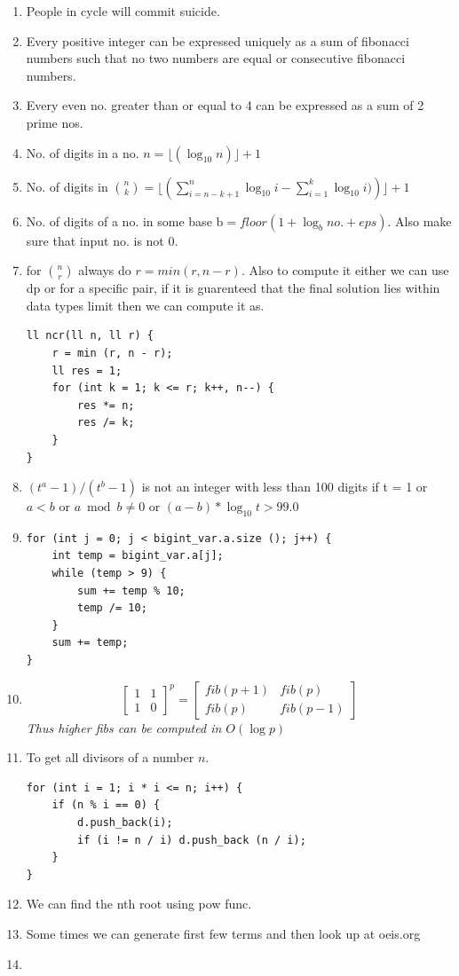 \documentclass[8pt, a4paper, oneside, twocolumn]{extarticle}
\begin{document}
\begin{enumerate}
    \item People in cycle will commit suicide.
    \item Every positive integer can be expressed uniquely as a sum of fibonacci numbers such that no two numbers are equal or consecutive fibonacci numbers.
    \item Every even no. greater than or equal to 4 can be expressed as a sum of 2 prime nos.
    \item No. of digits in a no. $n = \lfloor(\log_{10}{n})\rfloor + 1$
    \item No. of digits in $\binom{n}{k} = \lfloor(\sum_{i = n - k + 1}^{n}\log_{10}{i} - \sum_{i = 1}^{k}\log_{10}{i)})\rfloor + 1$
    \item No. of digits of a no. in some base b$ = floor(1 + \log_b{no.} + eps)$. Also make sure that input no. is not 0.
    \item for $\binom{n}{r}$ always do $r = min (r, n - r)$. Also to compute it either we can use dp or for a specific pair, if it is guarenteed that the final solution lies within data types limit then we can compute it as. \begin{verbatim}
ll ncr(ll n, ll r) {
    r = min (r, n - r);
    ll res = 1;
    for (int k = 1; k <= r; k++, n--) {
        res *= n;
        res /= k;
    }
}
    \end{verbatim}
    \item $(t^a - 1) / (t^b - 1)$ is not an integer with less than 100 digits if t = 1 or $a < b$ or $a \bmod b \neq 0$ or $(a - b) * \log_{10}{t} > 99.0$
    \item \begin{verbatim}
for (int j = 0; j < bigint_var.a.size (); j++) {
    int temp = bigint_var.a[j];
    while (temp > 9) {
        sum += temp % 10;
        temp /= 10;
    }
    sum += temp;
}
    \end{verbatim}
    \item \[\begin{bmatrix}
    1 & 1\\
    1 & 0
    \end{bmatrix}^{\!p}
=
\begin{bmatrix}
    fib(p + 1) & fib (p)\\
    fib (p) & fib (p - 1)
    \end{bmatrix}
    \]
    \textit{Thus higher fibs can be computed in $O(\log{p})$}
    \item To get all divisors of a number $n$.
    \begin{verbatim}
for (int i = 1; i * i <= n; i++) {
    if (n % i == 0) {
        d.push_back(i);
        if (i != n / i) d.push_back (n / i);
    }
}
    \end{verbatim}
    \item We can find the nth root using pow func.
    \item Some times we can generate first few terms and then look up at oeis.org
    \item 
\end{enumerate}
\end{document}
